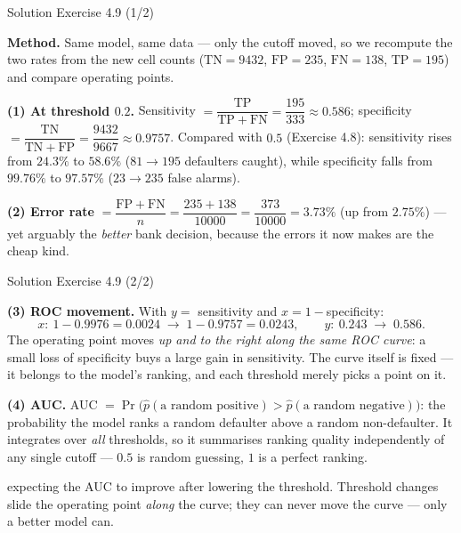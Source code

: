 \documentclass[aspectratio=169,11pt]{beamer}
\begin{document}
\begin{frame}{Solution \textemdash{} Exercise 4.9 (1/2)}
\begin{solutionbox}
\textbf{Method.} Same model, same data --- only the cutoff moved, so we
recompute the two rates from the new cell counts
($\mathrm{TN}=9432$, $\mathrm{FP}=235$, $\mathrm{FN}=138$,
$\mathrm{TP}=195$) and compare operating points.

\vspace{1mm}
\textbf{(1) At threshold $0.2$.}
Sensitivity $=\dfrac{\mathrm{TP}}{\mathrm{TP+FN}}=\dfrac{195}{333}
\approx 0.586$; specificity
$=\dfrac{\mathrm{TN}}{\mathrm{TN+FP}}=\dfrac{9432}{9667}\approx 0.9757$.
Compared with $0.5$ (Exercise 4.8): sensitivity
rises from $24.3\%$ to $58.6\%$ ($81\to195$ defaulters caught), while
specificity falls from $99.76\%$ to $97.57\%$ ($23\to235$ false
alarms).

\vspace{1mm}
\textbf{(2) Error rate} $=\dfrac{\mathrm{FP+FN}}{n}
=\dfrac{235+138}{10000}=\dfrac{373}{10000}
=3.73\%$ (up from $2.75\%$) --- yet arguably the \emph{better} bank
decision, because the errors it now makes are the cheap kind.
\end{solutionbox}
\end{frame}

\begin{frame}{Solution \textemdash{} Exercise 4.9 (2/2)}
\begin{solutionbox}
\textbf{(3) ROC movement.}
With $y=$ sensitivity and $x=1-$specificity:
\[
  x:\ 1-0.9976=0.0024 \;\to\; 1-0.9757=0.0243, \qquad
  y:\ 0.243 \;\to\; 0.586 .
\]
The operating point moves \emph{up and to the right along the same ROC
curve}: a small loss of specificity buys a large gain in sensitivity.
The curve itself is fixed --- it belongs to the model's ranking, and
each threshold merely picks a point on it.

\vspace{1mm}
\textbf{(4) AUC.}
AUC $=\Pr\big(\hat p(\text{a random positive}) >
\hat p(\text{a random negative})\big)$: the probability the model ranks
a random defaulter above a random non-defaulter. It integrates over
\emph{all} thresholds, so it summarises ranking quality independently of
any single cutoff --- $0.5$ is random guessing, $1$ is a perfect
ranking.
\end{solutionbox}
\begin{mistake}
expecting the AUC to improve after lowering the
threshold. Threshold changes slide the operating point \emph{along} the
curve; they can never move the curve --- only a better model can.
\end{mistake}
\end{frame}
\end{document}

